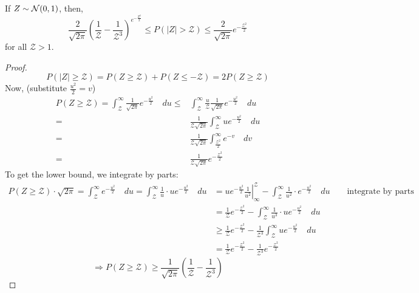 \begin{lemma}
If $Z \sim \mathcal{N}(0, 1)$, then,
\[
    \frac{2}{\sqrt{2\pi}} \left(
        \frac{1}{\mathcal{Z}}-\frac{1}{\mathcal{Z}^3}
    \right)^{e^{-\frac{Z^2}{2}}}
    \leq
    P(\vert Z \vert > \mathcal{Z})
    \leq
    \frac{2}{\sqrt{2\pi}}e^{-\frac{\mathcal{Z}^2}{2}}
\]
for all $\mathcal{Z} > 1$.
\end{lemma}
\begin{proof}
\[
      P(\vert Z \vert \geq \mathcal{Z})
    = P(Z \geq \mathcal{Z}) + P(Z \leq -\mathcal{Z})
    = 2P(Z \geq \mathcal{Z})
\]
Now, (substitute $\frac{u^2}{2} = v$)
\begin{align*}
      P(Z \geq \mathcal{Z}) 
    = \int_{\mathcal{Z}}^{\infty}
          \frac{1}{\sqrt{2\pi}} e^{-\frac{u^2}{2}}
      \quad du
    \leq& \int_{\mathcal{Z}}^{\infty}
          \frac{u}{\mathcal{Z}}
          \frac{1}{\sqrt{2\pi}}
          e^{-\frac{u^2}{2}}
    \quad du                                                              \\
    =& \frac{1}{\mathcal{Z}\sqrt{2\pi}}
       \int_{\mathcal{Z}}^{\infty} u e^{-\frac{u^2}{2}} \quad du          \\
    =& \frac{1}{\mathcal{Z}\sqrt{2\pi}}
       \int_{\frac{\mathcal{Z}^2}{2}}^{\infty}
           e^{-v}
       \quad dv                                                           \\
    =& \frac{1}{\mathcal{Z}\sqrt{2\pi}} e^{-\frac{\mathcal{Z}^2}{2}}
\end{align*}
To get the lower bound, we integrate by parts:
\begin{align*}
      P(Z \geq \mathcal{Z}) \cdot \sqrt{2\pi}
    = \int_{\mathcal{Z}}^{\infty}
          e^{-\frac{u^2}{2}}
      \quad du
    = \int_{\mathcal{Z}}^{\infty}
          \frac{1}{u} \cdot u e^{-\frac{u^2}{2}}
      \quad du
    &= \left. 
           u e^{-\frac{u^2}{2}} \frac{1}{u^2}
       \right\vert_{\infty}^{\mathcal{Z}} -
       \int_{\mathcal{Z}}^{\infty}
           \frac{1}{u^2} \cdot e^{-\frac{u^2}{2}}
       \quad du              
       \qquad \text{integrate by parts}                                      \\
    &= \frac{1}{\mathcal{Z}} e^{-\frac{\mathcal{Z}^2}{2}} -
       \int_{\mathcal{Z}}^{\infty}
           \frac{1}{u^3} \cdot u e^{-\frac{u^2}{2}}
       \quad du                                                              \\
    &\geq \frac{1}{\mathcal{Z}} e^{-\frac{\mathcal{Z}^2}{2}} -
          \frac{1}{\mathcal{Z}^3} \int_{\mathcal{Z}}^{\infty}
              u e^{-\frac{u^2}{2}}
          \quad du                                                           \\
    &= \frac{1}{\mathcal{Z}} e^{-\frac{\mathcal{Z}^2}{2}} -
       \frac{1}{\mathcal{Z}^3} e^{-\frac{\mathcal{Z}^2}{2}}
\end{align*}
\[
    \Rightarrow
    P(Z \geq \mathcal{Z}) \geq
        \frac{1}{\sqrt{2\pi}} (\frac{1}{\mathcal{Z}} - \frac{1}{\mathcal{Z}^3})
\]
\end{proof}
